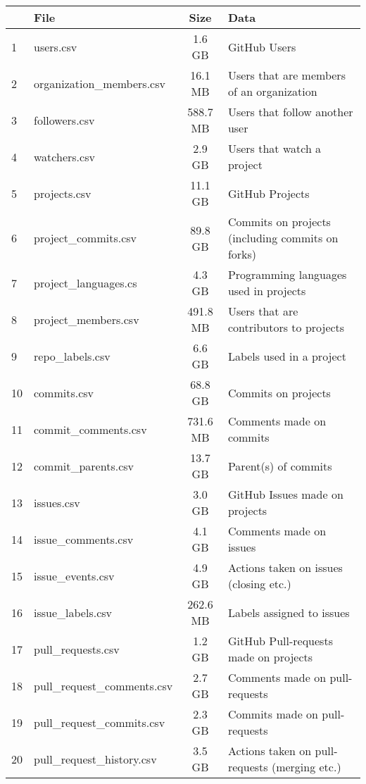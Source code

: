 \vspace{25px}
\begin{table}[htb]
    \centering
    \begin{tabular}{@{}llcl@{}}

        \toprule
             & File & Size & Data \\

        \midrule

           \rowcolor{LightCyan}
            1 & users.csv                   & 1.6 GB   & GitHub Users \\
           \rowcolor{LightCyan}
            2 & organization\_members.csv   & 16.1 MB  & Users that are members of an organization \\
           \rowcolor{LightCyan}
            3 & followers.csv               & 588.7 MB & Users that follow another user \\
           \rowcolor{LightCyan}
            4 & watchers.csv                & 2.9 GB   & Users that watch a project \\
           \rowcolor{LightCyan}
            5 & projects.csv                & 11.1 GB  & GitHub Projects \\
            6 & project\_commits.csv        & 89.8 GB  & Commits on projects (including commits on forks) \\
            7 & project\_languages.cs       & 4.3 GB   & Programming languages used in projects \\
           \rowcolor{LightCyan}
            8 & project\_members.csv        & 491.8 MB & Users that are contributors to projects \\
            9 & repo\_labels.csv            & 6.6 GB   & Labels used in a project \\
           \rowcolor{LightCyan}
           10 & commits.csv                 & 68.8 GB  & Commits on projects \\
           11 & commit\_comments.csv        & 731.6 MB & Comments made on commits \\
           12 & commit\_parents.csv         & 13.7 GB  & Parent(s) of commits \\
           \rowcolor{LightCyan}
           13 & issues.csv                  & 3.0 GB   & GitHub Issues made on projects \\
           14 & issue\_comments.csv         & 4.1 GB   & Comments made on issues \\
           15 & issue\_events.csv           & 4.9 GB   & Actions taken on issues (closing etc.) \\
           16 & issue\_labels.csv           & 262.6 MB & Labels assigned to issues \\
           17 & pull\_requests.csv          & 1.2 GB   & GitHub Pull-requests made on projects \\
           18 & pull\_request\_comments.csv & 2.7 GB   & Comments made on pull-requests \\
           19 & pull\_request\_commits.csv  & 2.3 GB   & Commits made on pull-requests \\
           20 & pull\_request\_history.csv  & 3.5 GB   & Actions taken on pull-requests (merging etc.) \\


\end{tabular}
\end{table}
